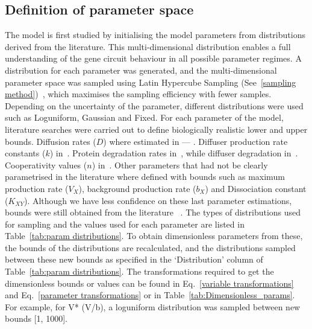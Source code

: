 \subsection{Definition of parameter space}
The model is first studied by initialising the model parameters from distributions derived from the literature.
This multi-dimensional distribution enables a full understanding of the gene circuit behaviour in all possible parameter regimes.
A distribution for each parameter was generated, and the multi-dimensional parameter space was sampled using Latin Hypercube Sampling (See~\ref{sampling method})~\parencite{Iman2014, Bergstra2012}, which maximises the sampling efficiency with fewer samples.
Depending on the uncertainty of the parameter, different distributions were used such as Loguniform, Gaussian and Fixed.
 For each parameter of the model, literature searches were carried out to define biologically realistic lower and upper bounds.
Diffusion rates ($D$) where estimated in --- .%
Diffuser production rate constants ($k$) in~\cite{Schaefer1996, Pai2009}.
Protein degradation rates in~\cite{Andersen1998}, while diffuser degradation in~\cite{Kaufmann2005}.
Cooperativity values ($n$) in~\cite{Babic2007}.
Other parameters that had not be clearly parametrised in the literature where defined with bounds such as maximum production rate ($V_{X}$), background production rate ($b_{X}$) and Dissociation constant ($K_{XY}$). Although we have less confidence on these last parameter estimations, bounds were still obtained from the literature ~\parencite{Scholes2019, Pusnik2019}.
The types of distributions used for sampling and the values used for each parameter are listed in Table~\ref{tab:param distributions}.
To obtain dimensionless parameters from these, the bounds of the distributions are recalculated, and the distributions sampled between these new bounds as specified in the ‘Distribution’ column of Table~\ref{tab:param distributions}.
The transformations required to get the dimensionless bounds or values can be found in Eq.~\ref{variable transformations} and Eq.~\ref{parameter transformations} or in Table~\ref{tab:Dimensionless_params}.
For example, for V* (V/b), a loguniform distribution was sampled between new bounds [1, 1000].
